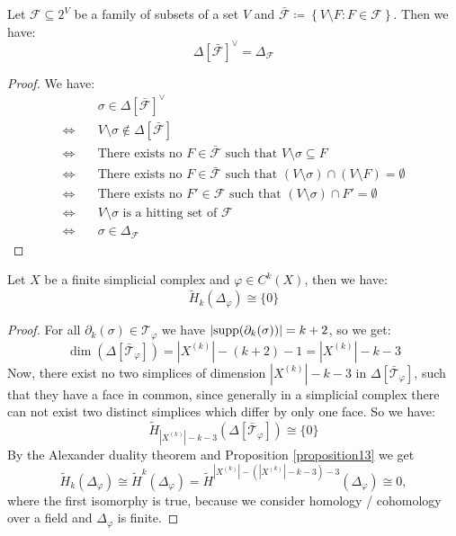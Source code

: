 \begin{prop}\label{proposition13}
Let \(\mathcal{F}\subseteq 2^V\) be a family of subsets of a set \(V\) and \(\bar{\mathcal{F}}\coloneqq \left\{V\setminus F:F\in\mathcal{F}\right\}\). Then we have:
\[
\Delta\left[\bar{\mathcal{F}}\right]^{\lor}=\Delta_{\mathcal{F}}
\]
\begin{proof}
We have:
\begin{align*}
  & \sigma\in\Delta\left[\bar{\mathcal{F}}\right]^{\lor} \\
  \Longleftrightarrow \quad & V\setminus\sigma\notin\Delta\left[\bar{\mathcal{F}}\right] \\
  \Longleftrightarrow \quad & \text{There exists no } F\in\bar{\mathcal{F}}\text{ such that }V\setminus\sigma\subseteq F \\
  \Longleftrightarrow \quad & \text{There exists no } F\in\bar{\mathcal{F}}\text{ such that }(V\setminus\sigma)\cap(V\setminus F)=\emptyset \\
  \Longleftrightarrow \quad & \text{There exists no } F'\in\mathcal{F}\text{ such that }(V\setminus\sigma)\cap F'=\emptyset \\
  \Longleftrightarrow \quad & V\setminus\sigma\text{ is a hitting set of }\mathcal{F} \\
  \Longleftrightarrow \quad & \sigma\in\Delta_{\mathcal{F}}
 \end{align*}
\end{proof}
\end{prop}

\begin{thm}
Let \(X\) be a finite simplicial complex and \(\varphi\in C^k(X)\), then we have:
\[
\tilde{H}_k(\Delta_{\varphi})\cong\{0\}
\]
\begin{proof}
For all \(\partial_k(\sigma)\in\mathcal{T}_{\varphi}\) we have \(|\mathrm{supp}(\partial_k(\sigma))|=k+2\), so we get:
\[
\dim(\Delta[\bar{\mathcal{T}}_{\varphi}])=|X^{(k)}|-(k+2)-1=|X^{(k)}|-k-3
\]
Now, there exist no two simplices of dimension \(|X^{(k)}|-k-3\) in \(\Delta[\bar{\mathcal{T}}_{\varphi}]\), such that they have a face in common, since generally in a simplicial complex there can not exist two distinct simplices which differ by only one face. So we have:
\[
\tilde{H}_{|X^{(k)}|-k-3}(\Delta[\bar{\mathcal{T}}_{\varphi}])\cong\{0\}
\]
By the Alexander duality theorem and Proposition \ref{proposition13} we get
\[
\tilde{H}_k(\Delta_{\varphi})\cong\tilde{H}^k(\Delta_{\varphi})=\tilde{H}^{|X^{(k)}|-(|X^{(k)}|-k-3)-3}(\Delta_{\varphi})\cong 0,
\]
where the first isomorphy is true, because we consider homology / cohomology over a field and \(\Delta_{\varphi}\) is finite.
\end{proof}
\end{thm}

